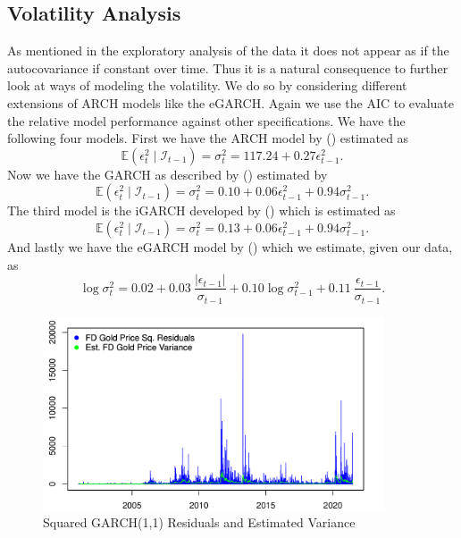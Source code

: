 \documentclass[a4paper]{article}
\theoremstyle{definition}
\begin{document}
\subsection{Volatility Analysis}
As mentioned in the exploratory analysis of the data it does not appear as if the autocovariance if constant over time. Thus it is a natural consequence to further look at ways of modeling the volatility. We do so by considering different extensions of ARCH models like the eGARCH. Again we use the AIC to evaluate the relative model performance against other specifications. We have the following four models. First we have the ARCH model by \citeauthor{Engle.1982} (\citeyear{Engle.1982}) estimated as
	\begin{equation}\tag{ARCH}
	\mathbb E(\epsilon_t^2 \mid \mathcal{I}_{t-1})= \sigma_t^2 = 117.24 + 0.27 \epsilon_{t-1}^2.	
	\end{equation}
Now we have the GARCH as described by \citeauthor{Bollerslev.1986} (\citeyear{Bollerslev.1986}) estimated by
	\begin{equation}\tag{GARCH}
	\mathbb E(\epsilon_t^2 \mid \mathcal{I}_{t-1})= \sigma_t^2 = 0.10 + 0.06 \epsilon_{t-1}^2 + 0.94 \sigma_{t-1}^2.
	\end{equation}
The third model is the iGARCH developed by \citeauthor{Engle.1986} (\citeyear{Engle.1986}) which is estimated as
	\begin{equation}\tag{iGARCH}
	\mathbb E(\epsilon_t^2 \mid \mathcal{I}_{t-1})= \sigma_t^2 = 0.13 + 0.06 \epsilon_{t-1}^2 + 0.94 \sigma_{t-1}^2.	
	\end{equation}
And lastly we have the eGARCH model by \citeauthor{Nelson.1991} (\citeyear{Nelson.1991}) which we estimate, given our data, as
	\begin{equation}\tag{eGARCH}
	\log \sigma_t^2 = 0.02 +0.03\ \frac{| \epsilon_{t-1}|}{\sigma_{t-1}} + 0.10 \log \sigma_{t-1}^2+ 0.11\ \frac{ \epsilon_{t-1}}{\sigma_{t-1}}.
	\end{equation}		
	\begin{figure}[!t]
	\centering
	\caption{Squared GARCH(1,1) Residuals and Estimated Variance}
	\includegraphics[width=0.90\textwidth]{volatHF}
	\end{figure}	
\end{document}
